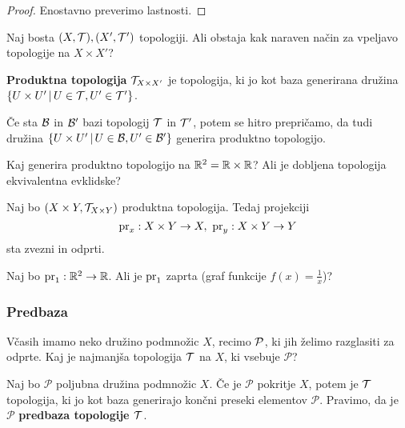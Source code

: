 \begin{proof}
    Enostavno preverimo lastnosti.
\end{proof}

\begin{primer}
    Naj bosta $(X, \mathcal{T}), (X', \mathcal{T}')$ topologiji. Ali obstaja kak naraven način za vpeljavo topologije na $X \times X'$?
\end{primer}
    
\begin{definicija}
    \textbf{Produktna topologija} $\mathcal{T}_{X \times X'}$ je topologija, ki jo kot baza generirana družina $\{U \times U' \,|\, U \in \mathcal{T}, U' \in \mathcal{T}'\}$.
\end{definicija}

\begin{opomba}
    Če sta $\mathcal{B}$ in $\mathcal{B}'$ bazi topologij $\mathcal{T}$ in $\mathcal{T}'$, potem se hitro prepričamo, da tudi družina $\{U \times U' \,|\, U \in \mathcal{B}, U' \in \mathcal{B}'\}$ generira produktno topologijo.
\end{opomba}

\begin{primer}
    Kaj generira produktno topologijo na $\mathbb{R}^2 = \mathbb{R} \times \mathbb{R}$? Ali je dobljena topologija ekvivalentna evklidske?
\end{primer}

\begin{trditev}
    Naj bo $(X \times Y, \mathcal{T}_{X \times Y})$ produktna topologija. Tedaj projekciji $$\operatorname{pr}_x: X \times Y \to X, \ \operatorname{pr}_y: X \times Y \to Y$$ sta zvezni in odprti.
\end{trditev}

\begin{primer} 
    Naj bo $\operatorname{pr}_1: \mathbb{R}^2 \to \mathbb{R}$. Ali je $\operatorname{pr}_1$ zaprta (graf funkcije $f(x) = \frac{1}{x}$)?    
\end{primer}

\subsubsection{Predbaza}

Včasih imamo neko družino podmnožic $X$, recimo $\mathcal{P}$, ki jih želimo razglasiti za odprte. Kaj je najmanjša topologija $\mathcal{T}$ na $X$, ki vsebuje $\mathcal{P}$?

\begin{trditev}
    Naj bo $\mathcal{P}$ poljubna družina podmnožic $X$. Če je $\mathcal{P}$ pokritje $X$, potem je $\mathcal{T}$ topologija, ki jo kot baza generirajo končni preseki elementov $\mathcal{P}$.
    Pravimo, da je $\mathcal{P}$ \textbf{predbaza topologije $\mathcal{T}$}.
\end{trditev}

